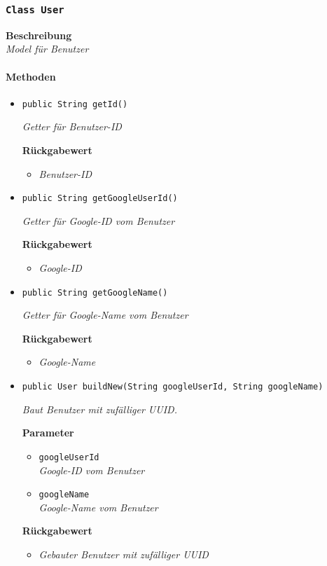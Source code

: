      \subsubsection{\texttt{Class User}}
     \textbf{Beschreibung} \\
     \textit{Model für Benutzer}
     \paragraph*{Methoden}
     \begin{itemize}
     	\item{\texttt{public String getId()}}
     	
     	\textit{Getter für Benutzer-ID}
     	
     	\textbf{Rückgabewert} 
     	\begin{itemize}
     		\item\textit{Benutzer-ID}
     	\end{itemize}
     
     \item{\texttt{public String getGoogleUserId()}}
     	
     	\textit{Getter für Google-ID vom Benutzer}
     	
     	\textbf{Rückgabewert}
     	\begin{itemize}
     		\item\textit{Google-ID}
     	\end{itemize}
     
     \item{\texttt{public String getGoogleName()}}
     	
     	\textit{Getter für Google-Name vom Benutzer}
     	
     	\textbf{Rückgabewert}
     	\begin{itemize}
     		\item\textit{Google-Name}
     	\end{itemize}
     
     \item{\texttt{public User buildNew(String googleUserId, String googleName)}}
     	
     	\textit{Baut Benutzer mit zufälliger UUID.}
     	
     	\textbf{Parameter}
     	\begin{itemize}
     		\item\texttt{googleUserId}\\
     		\textit{Google-ID vom Benutzer}
     		\item\texttt{googleName}\\
     		\textit{Google-Name vom Benutzer}
     	\end{itemize}
     	
     	\textbf{Rückgabewert}
     	\begin{itemize}
     		\item\textit{Gebauter Benutzer mit zufälliger UUID}
     	\end{itemize}
     \end{itemize}
     \newpage
